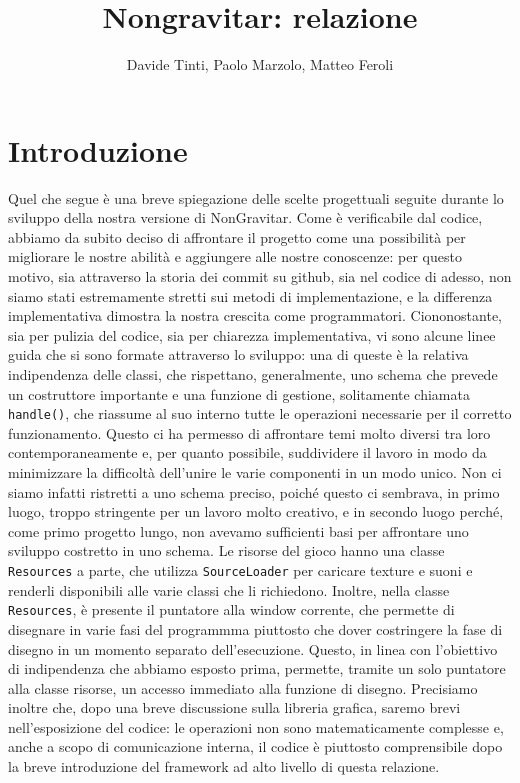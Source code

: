\documentclass{article}
\author{Davide Tinti, Paolo Marzolo, Matteo Feroli}
\title{Nongravitar: relazione}
\date{}
\begin{document}
\maketitle
\newpage

\section{Introduzione}
Quel che segue è una breve spiegazione delle scelte progettuali seguite durante lo sviluppo della nostra versione di NonGravitar. Come è verificabile dal codice, abbiamo da subito deciso di affrontare il progetto come una possibilità per migliorare le nostre abilità e aggiungere alle nostre conoscenze: per questo motivo, sia attraverso la storia dei commit su github, sia nel codice di adesso, non siamo stati estremamente stretti sui metodi di implementazione, e la differenza implementativa dimostra la nostra crescita come programmatori. \newline
Ciononostante, sia per pulizia del codice, sia per chiarezza implementativa, vi sono alcune linee guida che si sono formate attraverso lo sviluppo: una di queste è la relativa indipendenza delle classi, che rispettano, generalmente, uno schema che prevede un costruttore importante e una funzione di gestione, solitamente chiamata \lstinline{handle()}, che riassume al suo interno tutte le operazioni necessarie per il corretto funzionamento. \newline 
Questo ci ha permesso di affrontare temi molto diversi tra loro contemporaneamente e, per quanto possibile, suddividere il lavoro in modo da minimizzare la difficoltà dell'unire le varie componenti in un modo unico. Non ci siamo infatti ristretti a uno schema preciso, poiché questo ci sembrava, in primo luogo, troppo stringente per un lavoro molto creativo, e in secondo luogo perché, come primo progetto lungo, non avevamo sufficienti basi per affrontare uno sviluppo costretto in uno schema. \medskip \newline 
Le risorse del gioco hanno una classe \lstinline{Resources} a parte, che utilizza \lstinline{SourceLoader} per caricare texture e suoni e renderli disponibili alle varie classi che li richiedono. Inoltre, nella classe \lstinline{Resources}, è presente il puntatore alla window corrente, che permette di disegnare in varie fasi del programmma piuttosto che dover costringere la fase di disegno in un momento separato dell'esecuzione. Questo, in linea con l'obiettivo di indipendenza che abbiamo esposto prima, permette, tramite un solo puntatore alla classe risorse, un accesso immediato alla funzione di disegno. \medskip \newline
Precisiamo inoltre che, dopo una breve discussione sulla libreria grafica, saremo brevi nell'esposizione del codice: le operazioni non sono matematicamente complesse e, anche a scopo di comunicazione interna, il codice è piuttosto comprensibile dopo la breve introduzione del framework ad alto livello di questa relazione.
\end{document}
